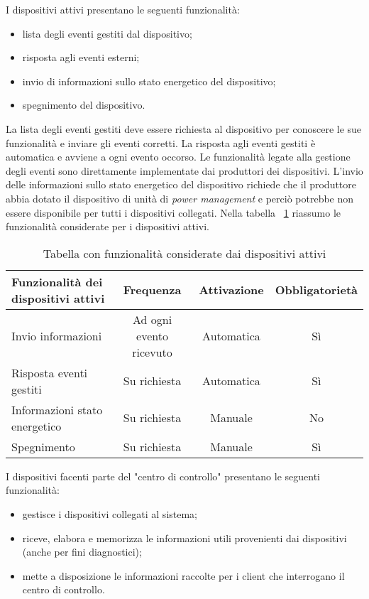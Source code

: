 I dispositivi attivi presentano le seguenti funzionalità:
\begin{itemize}
	\item lista degli eventi gestiti dal dispositivo;
	\item risposta agli eventi esterni;
	\item invio di informazioni sullo stato energetico del dispositivo;
	\item spegnimento del dispositivo.
\end{itemize}

La lista degli eventi gestiti deve essere richiesta al dispositivo per conoscere le sue funzionalità e inviare gli eventi corretti.
La risposta agli eventi gestiti è automatica e avviene a ogni evento occorso.
Le funzionalità legate alla gestione degli eventi sono direttamente implementate dai produttori dei dispositivi.
L'invio delle informazioni sullo stato energetico del dispositivo richiede che il produttore abbia dotato il dispositivo di unità di \emph{power management} e perciò potrebbe non essere disponibile per tutti i dispositivi collegati.
Nella tabella ~\ref{tab:funz-disp-attivi} riassumo le funzionalità considerate per i dispositivi attivi.

\begin{table}[H]
\caption{Tabella con funzionalità considerate dai dispositivi attivi}
\label{tab:funz-disp-attivi}
\begin{tabularx}{\linewidth}{|X|c|c|c|}
\hline
\textbf{Funzionalità dei dispositivi attivi} & \textbf{Frequenza} & \textbf{Attivazione} & \textbf{Obbligatorietà} \\
\hline
Invio informazioni & Ad ogni evento ricevuto & Automatica & Sì \\
\hline
Risposta eventi gestiti & Su richiesta & Automatica & Sì \\
\hline
Informazioni stato energetico & Su richiesta & Manuale & No \\
\hline
Spegnimento & Su richiesta & Manuale & Sì \\
\hline
\end{tabularx}
\end{table}

I dispositivi facenti parte del "centro di controllo" presentano le seguenti funzionalità:
\begin{itemize}
	\item gestisce i dispositivi collegati al sistema;
	\item riceve, elabora e memorizza le informazioni utili provenienti dai dispositivi (anche per fini diagnostici);
	\item mette a disposizione le informazioni raccolte per i client che interrogano il centro di controllo.
\end{itemize}

